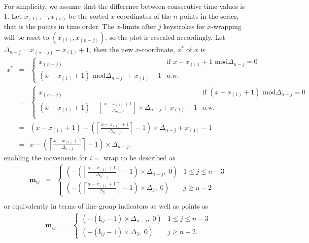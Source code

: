 \documentclass[12pt]{article}
\begin{document}
For simplicity, we assume that the difference between consecutive
time values is 1. Let  $x_{(1)},\cdots,x_{(n)}$ be the sorted
$x$-coordinates of the $n$ points in the series, that is the
points in time order. The $x$-limits after $j$ keystrokes for
$x$-wrapping will be reset to $(x_{(1)}, x_{(n-j)})$, so the
plot is rescaled accordingly. Let $\Delta_{n-j}=x_{(n-j)}-x_{(1)}+1$,
then the new $x$-coordinate, $x^*$ of $x$ is
\begin{eqnarray*}
x^* & = & \begin{cases}
x_{(n-j)}  & \mbox{if~} x-x_{(1)}+1 \mbox{~mod}\Delta_{n-j} = 0\\
(x-x_{(1)}+1) \mbox{~mod}\Delta_{n-j} ~~+x_{(1)}-1 &  \mbox{o.w.}
\end{cases} \\
& = & \begin{cases}
x_{(n-j)}  & \mbox{if~} (x-x_{(1)}+1) \mbox{~mod}\Delta_{n-j} = 0\\
(x-x_{(1)}+1)-\left\lfloor\frac{x-x_{(1)}+1}{\Delta_{n-j}}\right\rfloor\times\Delta_{n-j}+x_{(1)}-1 &\mbox{o.w.}\\
\end{cases} \\
 & = &
(x-x_{(1)}+1)-\left(\left\lceil\frac{x-x_{(1)}+1}{\Delta_{n-j}}\right\rceil -1\right)\times \Delta_{n-j} +x_{(1)}-1 \\ & = &
x-\left(\left\lceil \frac{x-x_{(1)}+1}{\Delta_{n-j}}\right\rceil -1\right)\times\Delta_{n-j},
\end{eqnarray*}
enabling the movements for $i=$ wrap to be described as
\begin{eqnarray*}
\mathbf{m}{}_{ij} & = & \begin{cases}
(-\left(\left\lceil \frac{\mathbf{x}-x_{(1)}+1}{\Delta_{n-j}}\right\rceil -1\right)\times\Delta_{n-j}, \; 0) & 1\leq j \leq n-3 \\
(-\left(\left\lceil \frac{\mathbf{x}-x_{(1)}+1}{\Delta_3}\right\rceil -1\right)\times\Delta_3, \; 0) & j\ge n-2
\end{cases} \\
\end{eqnarray*}
or equivalently in terms of line group indicators as well as points as
\begin{eqnarray*}
\mathbf{m}{}_{ij} & = & \begin{cases}
(-(\mathbf{l}{}_{ij} -1)\times\Delta_{n-j}, \; 0) & 1\leq j \leq n-3 \\
(-(\mathbf{l}{}_{ij} -1)\times\Delta_3, \; 0) & j\ge n-2.
\end{cases}
\end{eqnarray*}
\end{document}
